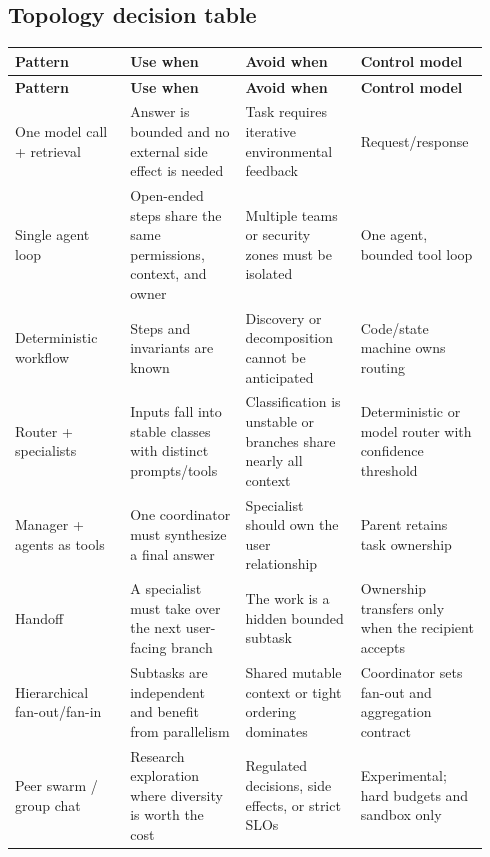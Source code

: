 \subsection{Topology decision table}

\BookTableStart
\fontsize{7.2}{9}\selectfont
\begin{longtable}{@{}Y{0.2350\linewidth}Y{0.2350\linewidth}Y{0.2350\linewidth}Y{0.2350\linewidth}@{}}
\color{white}\bfseries \textbf{Pattern} & \color{white}\bfseries \textbf{Use when} & \color{white}\bfseries \textbf{Avoid when} & \color{white}\bfseries \textbf{Control model} \\
\endfirsthead
{}
\color{white}\bfseries \textbf{Pattern} & \color{white}\bfseries \textbf{Use when} & \color{white}\bfseries \textbf{Avoid when} & \color{white}\bfseries \textbf{Control model} \\
\endhead
One model call + retrieval & Answer is bounded and no external side effect is needed & Task requires iterative environmental feedback & Request/response \\
Single agent loop & Open-ended steps share the same permissions, context, and owner & Multiple teams or security zones must be isolated & One agent, bounded tool loop \\
Deterministic workflow & Steps and invariants are known & Discovery or decomposition cannot be anticipated & Code/state machine owns routing \\
Router + specialists & Inputs fall into stable classes with distinct prompts/tools & Classification is unstable or branches share nearly all context & Deterministic or model router with confidence threshold \\
Manager + agents as tools & One coordinator must synthesize a final answer & Specialist should own the user relationship & Parent retains task ownership \\
Handoff & A specialist must take over the next user-facing branch & The work is a hidden bounded subtask & Ownership transfers only when the recipient accepts \\
Hierarchical fan-out/fan-in & Subtasks are independent and benefit from parallelism & Shared mutable context or tight ordering dominates & Coordinator sets fan-out and aggregation contract \\
Peer swarm / group chat & Research exploration where diversity is worth the cost & Regulated decisions, side effects, or strict SLOs & Experimental; hard budgets and sandbox only \\
\end{longtable}
\BookTableEnd


